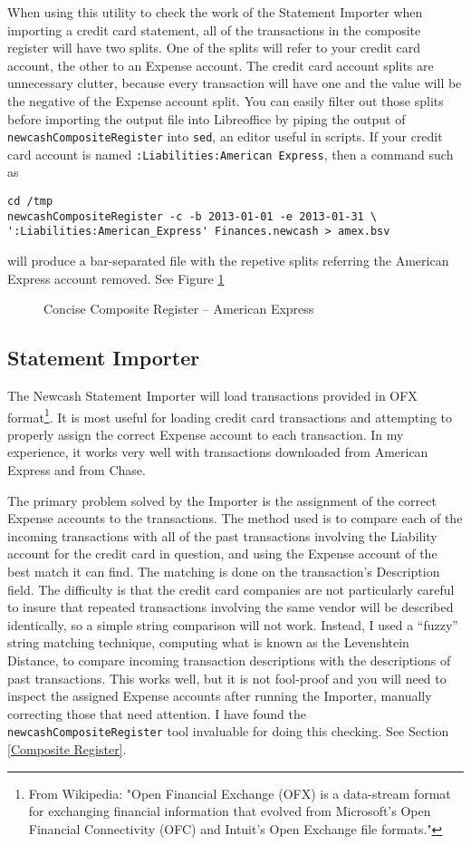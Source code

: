 \documentclass{report}
\newcommand{\graphicsfig}[5]{
\begin{figure}[#5]
\begin{center}
\resizebox{#1}{!}{\texttt{[image: \#2]}}
\end{center}
\caption{#3}
\label{#4}
\end{figure}
}
\begin{document}
When using this utility to check the work of the Statement Importer when importing a credit card statement, all of the transactions in the composite register will have two splits. One of the splits will refer to your credit card account, the other to an Expense account. The credit card account splits are unnecessary clutter, because every transaction will have one and the value will be the negative of the Expense account split. You can easily filter out those splits before importing the output file into Libreoffice by piping the output of \verb|newcashCompositeRegister| into \verb|sed|, an editor useful in scripts. If your credit card account is named \verb|:Liabilities:American Express|, then a command such as
\begin{verbatim}
cd /tmp
newcashCompositeRegister -c -b 2013-01-01 -e 2013-01-31 \
':Liabilities:American_Express' Finances.newcash > amex.bsv
\end{verbatim}
will produce a bar-separated file with the repetive splits referring the American Express account removed. See Figure \ref{Concise Composite Register -- American Express} 
\graphicsfig{5in}{figures/composite_register_amex.png}{Concise Composite Register -- American Express}{Concise Composite Register -- American Express}{}

\subsection{Statement Importer}
\label{Statement Importer}
The Newcash Statement Importer will load transactions provided in OFX format\footnote{From Wikipedia: "Open Financial Exchange (OFX) is a data-stream format for exchanging financial information that evolved from Microsoft's Open Financial Connectivity (OFC) and Intuit's Open Exchange file formats."}. It is most useful for loading credit card transactions and attempting to properly assign the correct Expense account to each transaction. In my experience, it works very well with transactions downloaded from American Express and from Chase.

The primary problem solved by the Importer is the assignment of the correct Expense accounts to the transactions. The method used is to compare each of the incoming transactions with all of the past transactions involving the Liability account for the credit card in question, and using the Expense account of the best match it can find. The matching is done on the transaction's Description field. The difficulty is that the credit card companies are not particularly careful to insure that repeated transactions involving the same vendor will be described identically, so a simple string comparison will not work. Instead, I used a ``fuzzy'' string matching technique, computing what is known as the Levenshtein Distance, to compare incoming transaction descriptions with the descriptions of past transactions. This works well, but it is not fool-proof and you will need to inspect the assigned Expense accounts after running the Importer, manually correcting those that need attention. I have found the \verb|newcashCompositeRegister| tool invaluable for doing this checking. See Section 
\ref{Composite Register}.
\end{document}
